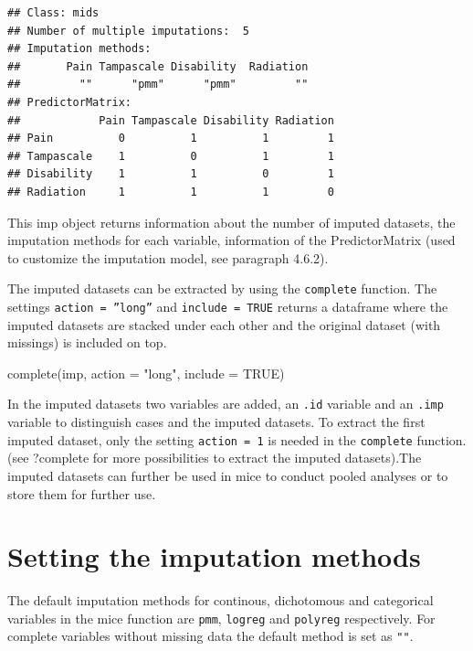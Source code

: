 \documentclass[
]{book}
\newenvironment{Shaded}{\begin{snugshade}}{\end{snugshade}}
\newcommand{\AttributeTok}[1]{\textcolor[rgb]{0.77,0.63,0.00}{#1}}
\newcommand{\ConstantTok}[1]{\textcolor[rgb]{0.00,0.00,0.00}{#1}}
\newcommand{\FunctionTok}[1]{\textcolor[rgb]{0.00,0.00,0.00}{#1}}
\newcommand{\NormalTok}[1]{#1}
\newcommand{\StringTok}[1]{\textcolor[rgb]{0.31,0.60,0.02}{#1}}
\begin{document}
\begin{verbatim}
## Class: mids
## Number of multiple imputations:  5 
## Imputation methods:
##       Pain Tampascale Disability  Radiation 
##         ""      "pmm"      "pmm"         "" 
## PredictorMatrix:
##            Pain Tampascale Disability Radiation
## Pain          0          1          1         1
## Tampascale    1          0          1         1
## Disability    1          1          0         1
## Radiation     1          1          1         0
\end{verbatim}

This imp object returns information about the number of imputed datasets, the imputation methods for each variable, information of the PredictorMatrix (used to customize the imputation model, see paragraph 4.6.2).

The imputed datasets can be extracted by using the \texttt{complete} function. The settings \texttt{action\ =\ ”long”} and \texttt{include\ =\ TRUE} returns a dataframe where the imputed datasets are stacked under each other and the original dataset (with missings) is included on top.

\begin{Shaded}
\begin{Highlighting}[]
\FunctionTok{complete}\NormalTok{(imp, }\AttributeTok{action =} \StringTok{"long"}\NormalTok{, }\AttributeTok{include =} \ConstantTok{TRUE}\NormalTok{)}
\end{Highlighting}
\end{Shaded}

In the imputed datasets two variables are added, an \texttt{.id} variable and an \texttt{.imp} variable to distinguish cases and the imputed datasets. To extract the first imputed dataset, only the setting \texttt{action\ =\ 1} is needed in the \texttt{complete} function. (see ?complete for more possibilities to extract the imputed datasets).The imputed datasets can further be used in mice to conduct pooled analyses or to store them for further use.

\hypertarget{setting-the-imputation-methods}{%
\section{Setting the imputation methods}\label{setting-the-imputation-methods}}

The default imputation methods for continous, dichotomous and categorical variables in the mice function are \texttt{pmm}, \texttt{logreg} and \texttt{polyreg} respectively. For complete variables without missing data the default method is set as \texttt{""}.
\end{document}

